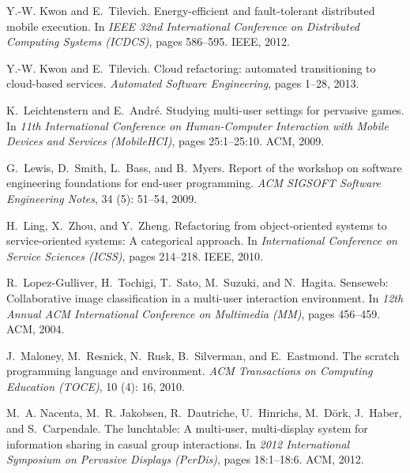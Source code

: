 \documentclass[article]{sigplanconf}
\begin{document}
\begin{thebibliography}{10}
Y.-W. Kwon and E.~Tilevich.
\newblock Energy-efficient and fault-tolerant distributed mobile execution.
\newblock In \emph{IEEE 32nd International Conference on Distributed Computing
  Systems (ICDCS)}, pages 586--595. IEEE, 2012.

Y.-W. Kwon and E.~Tilevich.
\newblock Cloud refactoring: automated transitioning to cloud-based services.
\newblock \emph{Automated Software Engineering}, pages 1--28, 2013.

K.~Leichtenstern and E.~Andr{\'e}.
\newblock Studying multi-user settings for pervasive games.
\newblock In \emph{11th International Conference on Human-Computer Interaction
  with Mobile Devices and Services (MobileHCI)}, pages 25:1--25:10. ACM, 2009.

G.~Lewis, D.~Smith, L.~Bass, and B.~Myers.
\newblock Report of the workshop on software engineering foundations for
  end-user programming.
\newblock \emph{ACM SIGSOFT Software Engineering Notes}, 34
  (5): 51--54, 2009.

H.~Ling, X.~Zhou, and Y.~Zheng.
\newblock Refactoring from object-oriented systems to service-oriented systems:
  A categorical approach.
\newblock In \emph{International Conference on Service Sciences (ICSS)}, pages
  214--218. IEEE, 2010.

R.~Lopez-Gulliver, H.~Tochigi, T.~Sato, M.~Suzuki, and N.~Hagita.
\newblock Senseweb: Collaborative image classification in a multi-user
  interaction environment.
\newblock In \emph{12th Annual ACM International Conference on Multimedia
  (MM)}, pages 456--459. ACM, 2004.

J.~Maloney, M.~Resnick, N.~Rusk, B.~Silverman, and E.~Eastmond.
\newblock The scratch programming language and environment.
\newblock \emph{ACM Transactions on Computing Education (TOCE)}, 10
  (4): 16, 2010.

M.~A. Nacenta, M.~R. Jakobsen, R.~Dautriche, U.~Hinrichs, M.~D\"{o}rk,
  J.~Haber, and S.~Carpendale.
\newblock The lunchtable: A multi-user, multi-display system for information
  sharing in casual group interactions.
\newblock In \emph{2012 International Symposium on Pervasive Displays
  (PerDis)}, pages 18:1--18:6. ACM, 2012.


\end{thebibliography}
\end{document}
